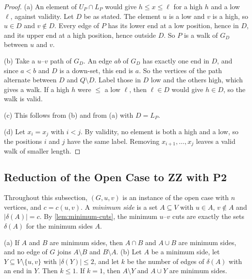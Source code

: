 \documentclass[pdflatex,sn-mathphys-num]{sn-jnl}%
\theoremstyle{thmstyleone}%
\theoremstyle{thmstyletwo}%
\theoremstyle{thmstylethree}%
\begin{document}
\begin{proof}
(a) An element of $U_P \cap L_P$ would give $h \leq x \leq \ell$ for a high $h$ and a low $\ell$, against validity.
Let $D$ be as stated.
The element $u$ is a low and $v$ is a high, so $u \in D$ and $v \notin D$.
Every edge of $P$ has its lower end at a low position, hence in $D$, and its upper end at a high position, hence outside $D$.
So $P$ is a walk of $G_D$ between $u$ and $v$.

(b) Take a $u$--$v$ path of $G_D$.
An edge $ab$ of $G_D$ has exactly one end in $D$, and since $a < b$ and $D$ is a down-set, this end is $a$.
So the vertices of the path alternate between $D$ and $Q \setminus D$.
Label those in $D$ low and the others high, which gives a walk.
If a high $h$ were $\leq$ a low $\ell$, then $\ell \in D$ would give $h \in D$, so the walk is valid.

(c) This follows from (b) and from (a) with $D = L_P$.

(d) Let $x_i = x_j$ with $i < j$.
By validity, no element is both a high and a low, so the positions $i$ and $j$ have the same label.
Removing $x_{i+1}, \dots, x_j$ leaves a valid walk of smaller length.
\end{proof}

\subsection{Reduction of the Open Case to ZZ with P2}
\label{sec:zz-reduction}

Throughout this subsection, $(G, u, v)$ is an instance of the open case with $n$ vertices, and $c = c(u, v)$.
A \emph{minimum side} is a set $A \subseteq V$ with $u \in A$, $v \notin A$ and $|\delta(A)| = c$.
By \cref{lem:minimum-cuts}, the minimum $u$--$v$ cuts are exactly the sets $\delta(A)$ for the minimum sides $A$.

\begin{lemma}
\label{lem:zz-sides}
(a) If $A$ and $B$ are minimum sides, then $A \cap B$ and $A \cup B$ are minimum sides, and no edge of $G$ joins $A \setminus B$ and $B \setminus A$.
(b) Let $A$ be a minimum side, let $Y \subseteq V \setminus \{u, v\}$ with $|\delta(Y)| \leq 2$, and let $k$ be the number of edges of $\delta(A)$ with an end in $Y$.
Then $k \leq 1$.
If $k = 1$, then $A \setminus Y$ and $A \cup Y$ are minimum sides.
\end{lemma}
\end{document}

